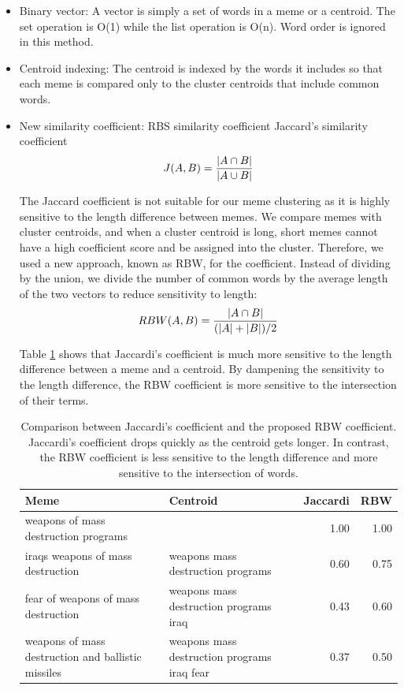 \documentclass{sig-alternate}
\begin{document}
\begin{itemize}
 \item Binary vector: A vector is simply a set of words in a meme or a centroid. The set operation is O(1) while the list operation is O(n). Word order is ignored in this method.
 \item Centroid indexing: The centroid is indexed by the words it includes so that each meme is compared only to the cluster centroids that include common words.
 \item New similarity coefficient: RBS similarity coefficient
 Jaccard's similarity coefficient 
\begin{displaymath} 
 J(A,B) = {{|A \cap B|}\over{|A \cup B|}}
\end{displaymath} 

The Jaccard coefficient is not suitable for our meme clustering as it is highly sensitive to the length difference between memes. We compare memes with cluster centroids, and when a cluster centroid is long, short memes cannot have a high coefficient score and be assigned into the cluster. Therefore, we used a new approach, known as RBW, for the coefficient. Instead of dividing by the union, we divide the number of common words by the average length of the two vectors to reduce sensitivity to length:\\

\begin{displaymath}
RBW(A, B) = {{|A \cap B|} \over {(|A|+|B|) / 2} }
\end{displaymath}

Table \ref{table:sim} shows that Jaccardi's coefficient is much more sensitive to the length difference between a meme and a centroid. By dampening the sensitivity to the length difference, the RBW coefficient is more sensitive to the intersection of their terms. 

\begin{table}[h!t!]
\begin{center}
\begin{tabular}{p{3.0cm}|p{2.2cm}|r|r}
\hline
\textbf{Meme}&\textbf{Centroid}&\textbf{Jaccardi}&\textbf{RBW}\\
\hline
weapons of mass destruction programs&&1.00&1.00\\
\hline
iraqs weapons of mass destruction & weapons mass destruction programs&0.60&0.75\\
\hline
fear of weapons of mass destruction & weapons mass destruction programs iraq&0.43&0.60\\
\hline
weapons of mass destruction and ballistic missiles&weapons mass destruction programs iraq fear&0.37&0.50\\
\hline
\end{tabular}
\caption{Comparison between Jaccardi's coefficient and the proposed RBW coefficient. Jaccardi's coefficient drops quickly as the centroid gets longer. In contrast, the RBW coefficient is less sensitive to the length difference and more sensitive to the intersection of words.}
\label{table:sim}
\end{center}
\end{table}


\end{itemize}
\end{document}
